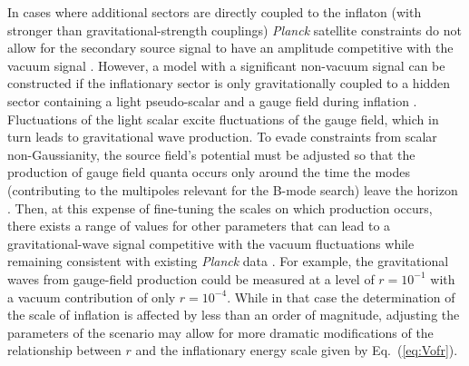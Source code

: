 
In cases where additional sectors are directly coupled to the inflaton (with stronger than gravitational-strength couplings) {\it Planck\/} satellite constraints do not allow for the secondary source signal to have an amplitude competitive with the vacuum signal \cite{Ozsoy:2014sba,Mirbabayi:2014jqa}. However, a model with a significant non-vacuum signal can be constructed if the inflationary sector is only gravitationally coupled to a hidden sector containing a light pseudo-scalar and a gauge field during inflation \cite{Barnaby:2012xt,Peloso:2016gqs}. Fluctuations of the light scalar excite fluctuations of the gauge field, which in turn leads to gravitational wave production. To evade constraints from scalar non-Gaussianity, the source field's potential must be adjusted so that the production of gauge field quanta occurs only around the time the modes (contributing to the multipoles relevant for the B-mode search) leave the horizon \cite{Namba:2015gja}. Then, at this expense of fine-tuning the scales on which production occurs, there exists a range of values for other parameters that can lead to a gravitational-wave signal competitive with the vacuum fluctuations while remaining consistent with existing {\it Planck\/} data \cite{Namba:2015gja,Peloso:2016gqs}. For example, the gravitational waves from gauge-field production could be measured at a level of $r=10^{-1}$ with a vacuum contribution of only $r=10^{-4}$. While in that case the determination of the scale of inflation is affected by less than an order of magnitude, adjusting the parameters of the scenario may allow for more dramatic modifications of the relationship between $r$ and the inflationary energy scale given by Eq.~(\ref{eq:Vofr}). 

